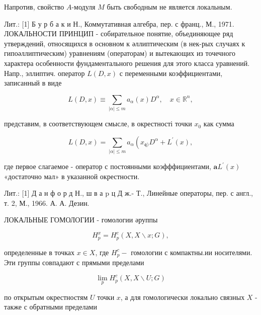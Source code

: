 \documentclass[10pt]{article}
\begin{document}
Напротив, свойство $A$-модуля $M$ быть свободным не является локальным.



Лит.: [1] Б у р б а к и Н., Коммутативная алгебра, пер. с франц., М., 1971. ЛОКАЛЬНОСТИ ПРИНЦИП - собирательное понятие, объединяющее ряд утверждений, относящихся в основном к әллиптическим (в нек-рых случаях к гипоәллиптическим) уравнениям (операторам) и вытекающих из точечного характера особенности фундаментального решения для этого класса уравнений. Напр., эллиптич. оператор $L(D, x)$ с переменными коэффициентами, записанный в виде



\[

L(D, x) \equiv \sum_{|\alpha| \leqslant m} a_{\alpha}(x) D^{\alpha}, \quad x \in \mathbb{R}^{n},

\]



представим, в соответствующем смысле, в окрестності точки $x_{0}$ как сумма



\[

L(D, x)=\sum_{|\alpha| \leqslant m} a_{\alpha}\left(x_{\mathfrak{q})} D^{\alpha}+L^{\prime}(x),\right.

\]



где первое слагаемое - оператор с постоянными коэфффициентами, $\boldsymbol{a} L^{\prime}(x)$ «достаточно мал» в указанной окрестности.



Лит.: [1] Д а н ф о р д Н., ш в а $\mathrm{p}$ ц Д ж.- Т., Линейные операторы, пер. с англ., т. 2, М., 1966. А. А. Дезин.



ЛОКАЛЬНЫЕ ГОМОЛОГИИ - гомологии әруппы



\[

H_{p}^{x}=H_{p}^{c}(X, X \backslash x ; G),

\]



определенные в точках $x \in X$, где $H_{p}^{c}-$ гомологии с компактны.ии носителями. Эти группы совпадают с прямыми пределами



\[

\lim _{p} H_{p}^{c}(X, X \backslash U ; G)

\]



по открытым окрестностям $U$ точки $x$, а для гомологически локально связных $X$ - также с обратными пределами
\end{document}
